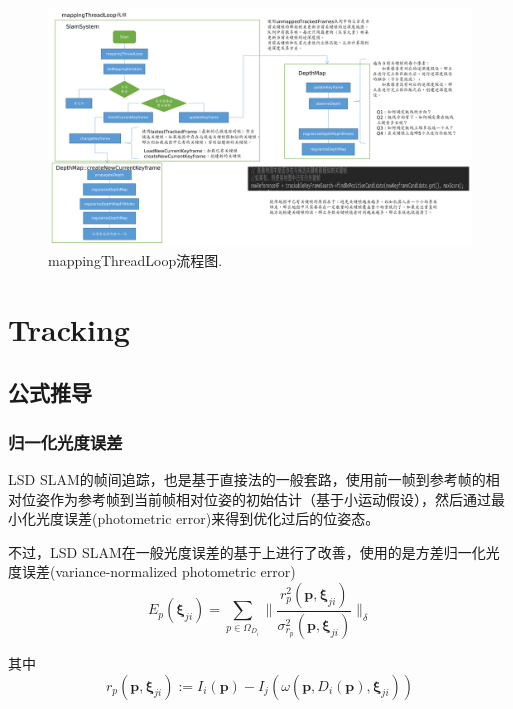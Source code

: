 \begin{figure}[h]%
	\centering  %
	\includegraphics[width=1.0\linewidth]{image/LSD-SLAM/LSD-SLAM-mapping}  %
	\caption{mappingThreadLoop流程图.}  %
	\label{fig:mapping_thread}   %
\end{figure}



\section{Tracking}
\subsection{公式推导}
\subsubsection{归一化光度误差}
	LSD SLAM的帧间追踪，也是基于直接法的一般套路，使用前一帧到参考帧的相对位姿作为参考帧到当前帧相对位姿的初始估计（基于小运动假设），然后通过最小化光度误差(photometric error)来得到优化过后的位姿态。
	
	不过，LSD SLAM在一般光度误差的基于上进行了改善，使用的是方差归一化光度误差(variance-normalized photometric error)
\begin{equation}
E_p(\bm{\xi}_{ji}) = \sum_{p \in \Omega_{D_i}}\| \frac{r_p^2(\bm{p}, \bm{\xi}_{ji})}{\sigma_{r_p}^{2}(\bm{p}, \bm{\xi}_{ji})} \|_\delta
\end{equation}

其中
\begin{equation}
	r_p(\bm{p},\bm{\xi}_{ji}) := I_i(\bm{p}) - I_j(\omega(\bm{p}, D_i(\bm{p}), \bm{\xi}_{ji}))
\end{equation}

